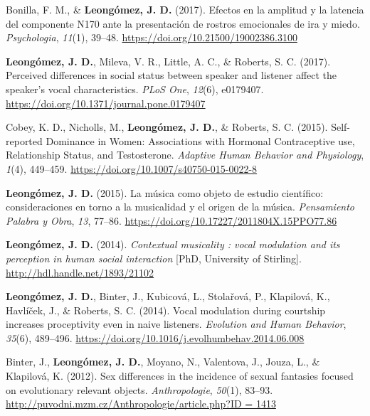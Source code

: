 \documentclass[11pt,a4paper,]{awesome-cv}
\begin{document}
\leavevmode{}%
Bonilla, F. M., \& \textbf{Leongómez, J. D.} (2017). {Efectos en la
amplitud y la latencia del componente N170 ante la presentaci{ó}n de
rostros emocionales de ira y miedo}. \emph{Psychologia}, \emph{11}(1),
39--48. \url{https://doi.org/10.21500/19002386.3100}

\leavevmode{}%
\textbf{Leongómez, J. D.}, Mileva, V. R., Little, A. C., \& Roberts, S.
C. (2017). {Perceived differences in social status between speaker and
listener affect the speaker's vocal characteristics}. \emph{PLoS One},
\emph{12}(6), e0179407.
\url{https://doi.org/10.1371/journal.pone.0179407}

\leavevmode{}%
Cobey, K. D., Nicholls, M., \textbf{Leongómez, J. D.}, \& Roberts, S. C.
(2015). {Self-reported Dominance in Women: Associations with Hormonal
Contraceptive use, Relationship Status, and Testosterone}.
\emph{Adaptive Human Behavior and Physiology}, \emph{1}(4), 449--459.
\url{https://doi.org/10.1007/s40750-015-0022-8}

\leavevmode{}%
\textbf{Leongómez, J. D.} (2015). {La m{ú}sica como objeto de estudio
cient{í}fico: consideraciones en torno a la musicalidad y el origen de
la m{ú}sica}. \emph{Pensamiento Palabra y Obra}, \emph{13}, 77--86.
\url{https://doi.org/10.17227/2011804X.15PPO77.86}

\leavevmode{}%
\textbf{Leongómez, J. D.} (2014). \emph{{Contextual musicality : vocal
modulation and its perception in human social interaction}} {[}PhD,
University of Stirling{]}. \url{http://hdl.handle.net/1893/21102}

\leavevmode{}%
\textbf{Leongómez, J. D.}, Binter, J., Kubicová, L., Stolařová, P.,
Klapilová, K., Havlíček, J., \& Roberts, S. C. (2014). {Vocal modulation
during courtship increases proceptivity even in naive listeners}.
\emph{Evolution and Human Behavior}, \emph{35}(6), 489--496.
\url{https://doi.org/10.1016/j.evolhumbehav.2014.06.008}

\leavevmode{}%
Binter, J., \textbf{Leongómez, J. D.}, Moyano, N., Valentova, J., Jouza,
L., \& Klapilová, K. (2012). {Sex differences in the incidence of sexual
fantasies focused on evolutionary relevant objects.}
\emph{Anthropologie}, \emph{50}(1), 83--93.
\href{http://puvodni.mzm.cz/Anthropologie/article.php?ID\%20=\%201413}{http://puvodni.mzm.cz/Anthropologie/article.php?ID
= 1413}
\end{document}
